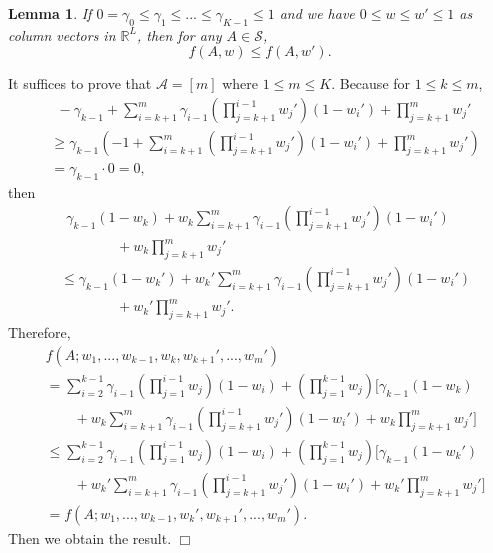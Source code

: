 \documentclass{article}
\newcommand{\RR}{\mathbb{R}}
\newcommand{\cA}{\mathcal{A}}
\newcommand{\cS}{\mathcal{S}}
\newtheorem{lemma}[theorem]{Lemma}%
\newenvironment{proof}{\noindent {\textbf{Proof. }}}{$\Box$ \medskip}
\begin{document}
\begin{lemma}
\label{lem:increasing} 
If $0= \gamma_0 \leq \gamma_1 \leq ... \leq \gamma_{K-1} \leq 1$ and we have $0 \leq w \leq w' \leq 1$ as column vectors in $\RR^L$, then for any $A\in\cS$,
$$
f(A, w) \leq f(A, w').
$$
\end{lemma}
\begin{proof}
It suffices to prove that $\cA = [m]$ where $1 \leq m \leq K$. Because for $1 \leq k \leq m$,
\begin{align*}
&~~-\gamma_{k-1} + \sum_{i=k+1}^m \gamma_{i-1}(\prod_{j=k+1}^{i-1}w_j')(1- w_i') + \prod_{j=k+1}^{m}w_j'\\
&\geq \gamma_{k-1} (-1 + \sum_{i=k+1}^m (\prod_{j=k+1}^{i-1}w_j')(1- w_i') +  \prod_{j=k+1}^{m}w_j')\\
&=\gamma_{k-1} \cdot 0 = 0,
\end{align*}
then
\begin{align*}
&~~\gamma_{k-1} (1 - w_k) + w_k\sum_{i=k+1}^m \gamma_{i-1}(\prod_{j=k+1}^{i-1}w_j')(1- w_i')\\
&\qquad \qquad + w_k\prod_{j=k+1}^{m}w_j'\\
& \leq \gamma_{k-1} (1 - w_k') + w_k'\sum_{i=k+1}^m \gamma_{i-1}(\prod_{j=k+1}^{i-1}w_j')(1- w_i')\\
&\qquad \qquad + w_k'\prod_{j=k+1}^{m}w_j'.
\end{align*}
Therefore, 
\begin{align*}
& f(A; w_1,...,w_{k-1},w_k,w_{k+1}',...,w_m')\\
&=\sum_{i=2}^{k-1} \gamma_{i-1} (\prod_{j=1}^{i-1}w_j)(1 - w_i) + (\prod_{j=1}^{k-1}w_j) [\gamma_{k-1} (1 - w_k) \\
&\qquad + w_k\sum_{i=k+1}^m \gamma_{i-1}(\prod_{j=k+1}^{i-1}w_j')(1- w_i') + w_k\prod_{j=k+1}^{m}w_j']\\
&\leq \sum_{i=2}^{k-1} \gamma_{i-1} (\prod_{j=1}^{i-1}w_j) (1 - w_i) + (\prod_{j=1}^{k-1}w_j) [\gamma_{k-1} (1 - w_k') \\
&\qquad + w_k'\sum_{i=k+1}^m \gamma_{i-1} (\prod_{j=k+1}^{i-1}w_j')(1- w_i') + w_k'\prod_{j=k+1}^{m}w_j']\\
&=f(A; w_1,...,w_{k-1},w_{k}',w_{k+1}',...,w_m').
\end{align*}
Then we obtain the result.
\end{proof}
	
\end{document}
